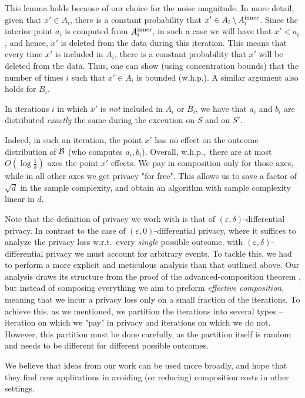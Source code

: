 \documentclass[12pt,a4paper,oneside,onecolumn]{book}
\begin{document}
This lemma holds because of our choice for the noise magnitude. In more detail, given that $x'\in A_i$, there is a constant probability that $x'\in A_i\setminus A_i^{\rm inner}$. Since the interior point $a_i$ is computed from $A_i^{\rm inner}$, in such a case we will have that $x'<a_i$, and hence, $x'$ is deleted from the data during this iteration. This means that every time $x'$ is included in $A_i$, there is a constant probability that $x'$ will be deleted from the data. Thus, one can show (using concentration bounds) that the number of times $i$ such that $x'\in A_i$ is bounded (w.h.p.). A similar argument also holds for $B_i$.

\begin{lemma}[informal]
In iterations $i$ in which $x'$ is {\em not} included in $A_i$ or $B_i$, we have that $a_i$ and $b_i$ are distributed {\em exactly} the same during the execution on $S$ and on $S'$.
\end{lemma}

Indeed, in such an iteration, the point $x'$ has no effect on the outcome distribution of $\mathcal{B}$ (who computes $a_i,b_i$). 
Overall, w.h.p.,\ there are at most $O(\log\frac{1}{\delta})$ axes the point $x'$ effects. We pay in composition only for those axes, while in all other axes we get privacy "for free". This allows us to save a factor of $\sqrt{d}$ in the sample complexity, and obtain an algorithm with sample complexity linear in $d$.


Note that the definition of privacy we work with is that of $(\varepsilon,\delta)$-differential privacy.
In contrast to the case of $(\varepsilon,0)$-differential privacy,
where it suffices to analyze the privacy loss w.r.t.\ every {\em single} possible outcome,
with $(\varepsilon,\delta)$-differential privacy we must account for arbitrary events. 
To tackle this, we had to perform a more explicit and meticulous analysis than that outlined above.
Our analysis draws its structure from the proof of the advanced-composition theorem \citep{dwork_boosting_2010},
but instead of composing everything we aim to preform \emph{effective composition},
meaning that we incur a privacy loss only on a small fraction of the iterations.
To achieve this, as we mentioned, we partition the iterations into several types -- iteration on which we "pay" in privacy and iterations on which we do not. However, this partition must be done carefully, as the partition itself is random and needs to be different for different possible outcomes.


We believe that ideas from our work can be used more broadly, and hope that they find new applications in avoiding (or reducing) composition costs in other settings.
\end{document}
